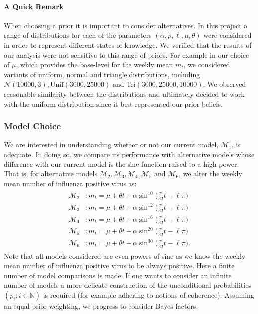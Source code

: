 \documentclass[letterpaper,10pt,english]{sphinxmanual}
\begin{document}
\noindent{}


\paragraph{A Quick Remark}
\label{\detokenize{models/how_big:a-quick-remark}}
When choosing a prior it is important to consider alternatives. In this
project a range of distributions for each of the parameters
\((\alpha, \rho, \ell, \mu, \theta)\) were considered in order to
represent different states of knowledge. We verified that the results of
our analysis were not sensitive to this range of priors. For example in
our choice of \(\mu\), which provides the base-level for the weekly
mean \(m_{t}\), we considered variants of uniform, normal and
triangle distributions, including
\(\mathcal{N}(10000,3),\mbox{Unif}(3000,25000)\) and
\(\text{Tri}(3000,25000,10000)\). We observed reasonable similarity
between the distributions and ultimately decided to work with the
uniform distribution since it best represented our prior beliefs.


\subsubsection{Model Choice}
\label{\detokenize{models/how_big:model-choice}}
We are interested in understanding whether or not our current model,
\(\mathcal{M}_{1}\), is adequate. In doing so, we compare its
performance with alternative models whose difference with our current
model is the sine function raised to a high power. That is, for alternative models \(\mathcal{M}_{2}, \mathcal{M}_{3}, \mathcal{M}_{4}, \mathcal{M}_{5}\) and \(\mathcal{M}_{6}\), we alter the weekly mean number of influenza
positive virus as:
\begin{equation*}
\begin{split}\begin{aligned}
 \mathcal{M}_{2} &:  m_{t} = \mu + \theta t + \alpha \sin^{10}\Big(\frac{\pi}{52}t - \ell\pi\Big) \\
 \mathcal{M}_{3} &:  m_{t} = \mu + \theta t + \alpha \sin^{12}\Big(\frac{\pi}{52}t - \ell\pi\Big) \\
 \mathcal{M}_{4} &:  m_{t} = \mu + \theta t + \alpha \sin^{16}\Big(\frac{\pi}{52}t - \ell\pi\Big) \\
 \mathcal{M}_{5} &:  m_{t} = \mu + \theta t + \alpha \sin^{20}\Big(\frac{\pi}{52}t - \ell\pi\Big) \\
 \mathcal{M}_{6} &:  m_{t} = \mu + \theta t + \alpha \sin^{30}\Big(\frac{\pi}{52}t - \ell\pi\Big).  \end{aligned}\end{split}
\end{equation*}
Note that all models considered are even powers of sine as we know the weekly mean number of influenza positive virus to be always positive.
Here a finite number of model comparisons is made. If one wants to
consider an infinite number of models a more delicate construction of
the unconditional probabilities \((p_{i} : i \in \mathbb{N})\) is
required (for example adhering to notions of coherence). Assuming an
equal prior weighting, we progress to consider Bayes factors.
\end{document}
